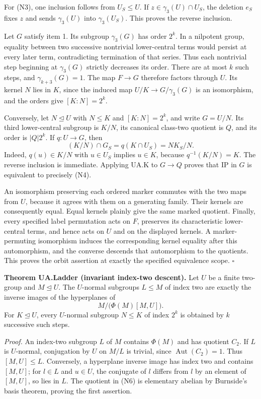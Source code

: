 \documentclass[
  11pt,
  a4paper,
]{article}
\begin{document}
For (N3), one inclusion follows from \(U_S\leq U\). If
\(z\in\gamma_3(U)\cap U_S\), the deletion \(e_S\) fixes \(z\) and sends
\(\gamma_3(U)\) into \(\gamma_3(U_S)\). This proves the reverse
inclusion.

Let \(G\) satisfy item 1. Its subgroup \(\gamma_3(G)\) has order
\(2^k\). In a nilpotent group, equality between two successive
nontrivial lower-central terms would persist at every later term,
contradicting termination of that series. Thus each nontrivial step
beginning at \(\gamma_3(G)\) strictly decreases its order. There are at
most \(k\) such steps, and \(\gamma_{k+3}(G)=1\). The map \(F\to G\)
therefore factors through \(U\). Its kernel \(N\) lies in \(K\), since
the induced map \(U/K\to G/\gamma_3(G)\) is an isomorphism, and the
orders give \([K:N]=2^k\).

Conversely, let \(N\unlhd U\) with \(N\leq K\) and \([K:N]=2^k\), and
write \(G=U/N\). Its third lower-central subgroup is \(K/N\), its
canonical class-two quotient is \(Q\), and its order is \(|Q|2^k\). If
\(q:U\to G\), then \[
(K/N)\cap G_S=q(K\cap U_S)=NK_S/N.
\tag{N5}
\] Indeed, \(q(u)\in K/N\) with \(u\in U_S\) implies \(u\in K\), because
\(q^{-1}(K/N)=K\). The reverse inclusion is immediate. Applying UA.K to
\(G\to Q\) proves that IP in \(G\) is equivalent to precisely (N4).

An isomorphism preserving each ordered marker commutes with the two maps
from \(U\), because it agrees with them on a generating family. Their
kernels are consequently equal. Equal kernels plainly give the same
marked quotient. Finally, every specified label permutation acts on
\(F\), preserves its characteristic lower-central terms, and hence acts
on \(U\) and on the displayed kernels. A marker-permuting isomorphism
induces the corresponding kernel equality after this automorphism, and
the converse descends that automorphism to the quotients. This proves
the orbit assertion at exactly the specified equivalence scope.
\(\square\)

\textbf{Theorem UA.Ladder (invariant index-two descent).} Let \(U\) be a
finite two-group and \(M\unlhd U\). The \(U\)-normal subgroups
\(L\leq M\) of index two are exactly the inverse images of the
hyperplanes of \[
M/\bigl(\Phi(M)[M,U]\bigr).
\tag{N6}
\] For \(K\unlhd U\), every \(U\)-normal subgroup \(N\leq K\) of index
\(2^k\) is obtained by \(k\) successive such steps.

\emph{Proof.} An index-two subgroup \(L\) of \(M\) contains \(\Phi(M)\)
and has quotient \(C_2\). If \(L\) is \(U\)-normal, conjugation by \(U\)
on \(M/L\) is trivial, since \(\operatorname{Aut}(C_2)=1\). Thus
\([M,U]\leq L\). Conversely, a hyperplane inverse image has index two
and contains \([M,U]\); for \(l\in L\) and \(u\in U\), the conjugate of
\(l\) differs from \(l\) by an element of \([M,U]\), so lies in \(L\).
The quotient in (N6) is elementary abelian by Burnside's basis theorem,
proving the first assertion.
\end{document}

